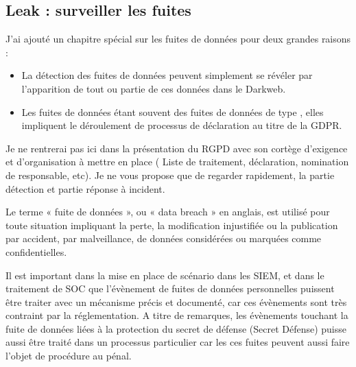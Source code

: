 


\subsection{Leak  : surveiller les fuites}

J'ai ajouté un chapitre spécial sur les fuites de données pour deux grandes raisons :

\begin{itemize}
  \item La détection des fuites de données peuvent simplement se révéler par l'apparition de tout ou partie de ces données dans le Darkweb. 
  \item Les fuites de données étant souvent des fuites de données de type , elles impliquent le déroulement de processus de déclaration au titre de la GDPR.
\end{itemize}


Je ne rentrerai pas ici dans la présentation du RGPD avec son cortège d'exigence et d'organisation à mettre en place (
Liste de traitement, déclaration, nomination de responsable, etc).
Je ne vous propose que de regarder rapidement, la partie détection et partie réponse à incident.

Le terme « fuite de données », ou « data breach » en anglais, est utilisé pour toute situation impliquant la perte, la modification injustifiée ou la publication par accident, par malveillance, de données considérées ou marquées comme confidentielles. 

Il est important dans la mise en place de scénario dans les SIEM, et dans le traitement de SOC que l'évènement de fuites de données personnelles puissent être traiter avec un mécanisme précis et documenté, car ces évènements sont très contraint par la réglementation.
A titre de remarques, les évènements touchant la fuite de données liées à la protection du secret de défense (Secret Défense) puisse aussi être traité dans un processus particulier car les ces fuites peuvent aussi faire l'objet de procédure au pénal.


